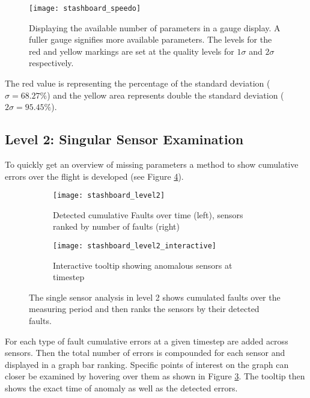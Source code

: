 \begin{figure}[!h]
    \centering
    \texttt{[image: stashboard\_speedo]}
    \caption[Stashboard: Level 1]{Displaying the available number of parameters in a gauge display. A fuller gauge signifies more available parameters. The levels for the red and yellow markings are set at the quality levels for $1\sigma$ and $2\sigma$ respectively.}
    \label{fig:stashboard_speedo}
\end{figure}
The red value is representing the percentage of the standard deviation ($\sigma=68.27\%$) and the yellow area represents double the standard deviation ($2\sigma=95.45\%$).

\subsection{Level 2: Singular Sensor Examination}
To quickly get an overview of missing parameters a method to show cumulative errors over the flight is developed (see Figure \ref{fig:stashboard_level2}).
\begin{figure}[!h]
    \centering
    \begin{subfigure}[b]{1\textwidth}
        \centering
        \texttt{[image: stashboard\_level2]}
        \caption{Detected cumulative Faults over time (left), sensors ranked by number of faults (right)}
        \label{fig:stashboard_level2_clean}
    \end{subfigure}
    \begin{subfigure}[b]{1\textwidth}
        \centering
        \texttt{[image: stashboard\_level2\_interactive]}
        \caption{Interactive tooltip showing anomalous sensors at timestep}
        \label{fig:stashboard_level2_interactive}
    \end{subfigure}
    \caption[Stashboard: Level 2 display plotting $n_{errors}$ over the recording time and a total $n_{errors}$ ranking.]{The single sensor analysis in level 2 shows cumulated faults over the measuring  period and then ranks the sensors by their detected faults.}
    \label{fig:stashboard_level2}
\end{figure}

For each type of fault cumulative errors at a given timestep are added across sensors. Then the total number of errors is compounded for each sensor and displayed in a graph bar ranking.
Specific points of interest on the graph can closer be examined by hovering over them as shown in Figure \ref{fig:stashboard_level2_interactive}. The tooltip then shows the exact time of anomaly as well as the detected errors.


